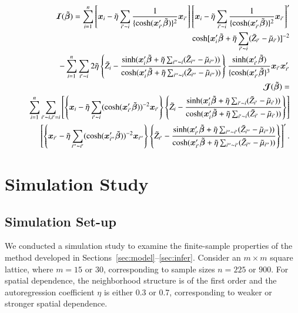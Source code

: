 \documentclass[authoryear,review, 12pt]{elsarticle}
\begin{document}
\begin{eqnarray*}
&&\bm{\mathcal{I}}(\tilde{\bm{\beta}})=\sum_{i=1}^n \left[ \bm{x}_i-\tilde{\eta} \sum_{i'\thicksim i} \frac{1}{\{\cosh(\bm{x}_{i'}'\tilde{\bm{\beta}})\}^2}\bm{x}_{i'}\right]  
\left[ \bm{x}_i-\tilde{\eta} \sum_{i'\thicksim i} \frac{1}{\{\cosh(\bm{x}_{i'}'\tilde{\bm{\beta}})\}^2}\bm{x}_{i'}\right]'\\
&&\quad\quad\cosh[\bm{x}_i'\tilde{\bm{\beta}}+\tilde{\eta}\sum_{i'\thicksim i}(\tilde{Z}_{i'}-\tilde{\mu}_{i'})]^{-2}\\ 
&&\quad\quad-\sum_{i=1}^n \sum_{i'\thicksim i}2 \tilde{\eta} \left\{\tilde{Z}_i-\frac{\sinh({\bm{x}_i'\tilde{\bm{\beta}}+\tilde{\eta}\sum_{i''\thicksim i}(\tilde{Z}_{i''}-\tilde{\mu}_{i''})})}{\cosh(\bm{x}_i'\tilde{\bm{\beta}}+\tilde{\eta}\sum_{i''\thicksim i}(\tilde{Z}_{i''}-\tilde{\mu}_{i''}))}\right\}
\frac{\sinh(\bm{x}_{i'}'\tilde{\bm{\beta}})}{\{\cosh(\bm{x}_{i'}'\tilde{\bm{\beta}}\}^3}\bm{x}_{i'}\bm{x}_{i'}'\\
&&\bm{\mathcal{J}}(\tilde{\bm{\beta}})= \\
&&\sum_{i=1}^n\sum_{i'\thicksim i, i'=i}\left[\left\{ \bm{x}_i-\tilde{\eta} \sum_{i'\thicksim i} (\cosh(\bm{x}_{i'}'\tilde{\bm{\beta}}))^{-2}\bm{x}_{i'} \right\} \left\{\tilde{Z}_i-\frac{\sinh({\bm{x}_i'\tilde{\bm{\beta}}+\tilde{\eta}\sum_{i' \thicksim i}(\tilde{Z}_{i'}-\tilde{\mu}_{i'})})}{\cosh(\bm{x}_i'\tilde{\bm{\beta}}+\tilde{\eta}\sum_{i'\thicksim i}(\tilde{Z}_{i'}-\tilde{\mu}_{i'}))}\right\}\right]\\ 
&&\quad\quad\left[\left\{\bm{x}_{i'}-\tilde{\eta} \sum_{i''\thicksim i'} (\cosh(\bm{x}_{i''}'\tilde{\bm{\beta}}))^{-2}\bm{x}_{i''}\right\} \left\{\tilde{Z}_{i'}-\frac{\sinh({\bm{x}_{i'}'\tilde{\bm{\beta}}+\tilde{\eta}\sum_{i''\thicksim i'}(\tilde{Z}_{i''}-\tilde{\mu}_{i''})})}{\cosh(\bm{x}_{i'}'\tilde{\bm{\beta}}+\tilde{\eta}\sum_{i''\thicksim i'}(\tilde{Z}_{i''}-\tilde{\mu}_{i''}))}\right\}\right]'.
\end{eqnarray*}

\section{Simulation Study}
\label{sec:simu}

\subsection{Simulation Set-up}

We conducted a simulation study to examine the finite-sample properties of the method developed in Sections~\ref{sec:model}--\ref{sec:infer}.  Consider an $m\times m$ square lattice, where $m=15$ or $30$, corresponding to sample sizes $n=225$ or $900$.  For spatial dependence, the neighborhood structure is of the first order and the autoregression coefficient $\eta$ is either 0.3 or 0.7, corresponding to weaker or stronger spatial dependence. 
\end{document}
